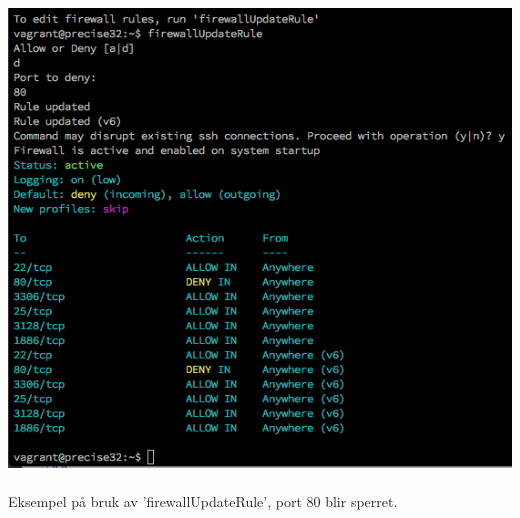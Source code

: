\documentclass{article}
\begin{document}
\\ \\ 
\includegraphics[scale =0.7]{pictures/firewallUpdate.png}
\\ \\
Eksempel på bruk av 'firewallUpdateRule', port 80 blir sperret.
\end{document}
